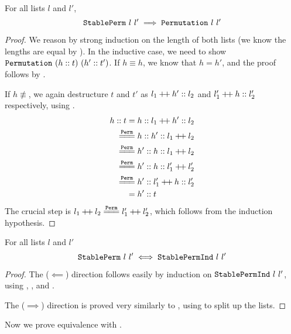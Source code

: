 \documentclass[sigplan,10pt,anonymous,review]{thesis}
\begin{document}
\begin{theorem}
  For all lists $l$ and $l'$,
  \begin{equation*}
    \texttt{StablePerm}~l~l' \implies \texttt{Permutation}~l~l'
  \end{equation*}
\end{theorem}
\begin{proof}
  We reason by strong induction on the length of both lists (we know
  the lengths are equal by ). In the inductive
  case, we need to show $\texttt{Permutation}~(h :: t)~(h' :: t')$. If $h
  \equiv h$, we know that $h = h'$, and the proof follows by
  .

  If $h \not\equiv$, we again destructure $t$ and $t'$ as $l_1 \mathbin{+\mkern-3mu+} h' ::
  l_2$ and $l_1' \mathbin{+\mkern-3mu+} h :: l_2'$ respectively, using
  .
  \begin{align*}
    h::t ={}& h :: l_1 \dplus h' :: l_2 \\
    \eqperm{}& h :: h' :: l_1 \dplus l_2 \\
    \eqperm{}& h' :: h :: l_1 \dplus l_2 \\
    \eqperm{}& h' :: h :: l_1' \dplus l_2' \\
    \eqperm{}& h' :: l_1' \dplus h :: l_2' \\
    ={}& h'::t
  \end{align*}
  The crucial step is $l_1 \dplus l_2 \eqperm l_1' \dplus l_2'$, which
  follows from the induction hypothesis.
\end{proof}

\begin{theorem}
  For all lists $l$ and $l'$
  \begin{equation*}
    \texttt{StablePerm}~l~l' \iff \texttt{StablePermInd}~l~l'
  \end{equation*}
\end{theorem}
\begin{proof}
  The ($\impliedby$) direction follows easily by induction on
  $\texttt{StablePermInd}~l~l'$, using ,
  , and .

  The ($\implies$) direction is proved very similarly to
  , using  to split up
  the lists.
\end{proof}

Now we prove equivalence with .
\end{document}
